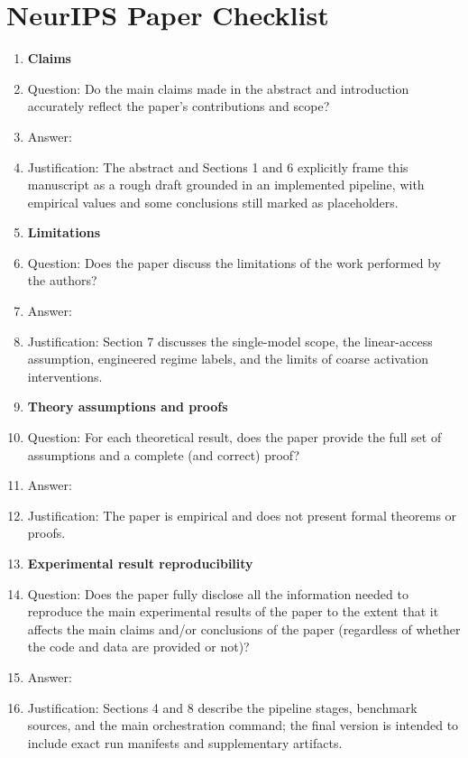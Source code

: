 \section*{NeurIPS Paper Checklist}

\begin{enumerate}

\item {\bf Claims}
    \item[] Question: Do the main claims made in the abstract and introduction accurately reflect the paper's contributions and scope?
    \item[] Answer: \answerYes{}
    \item[] Justification: The abstract and Sections 1 and 6 explicitly frame this manuscript as a rough draft grounded in an implemented pipeline, with empirical values and some conclusions still marked as placeholders.

\item {\bf Limitations}
    \item[] Question: Does the paper discuss the limitations of the work performed by the authors?
    \item[] Answer: \answerYes{}
    \item[] Justification: Section 7 discusses the single-model scope, the linear-access assumption, engineered regime labels, and the limits of coarse activation interventions.

\item {\bf Theory assumptions and proofs}
    \item[] Question: For each theoretical result, does the paper provide the full set of assumptions and a complete (and correct) proof?
    \item[] Answer: \answerNA{}
    \item[] Justification: The paper is empirical and does not present formal theorems or proofs.

\item {\bf Experimental result reproducibility}
    \item[] Question: Does the paper fully disclose all the information needed to reproduce the main experimental results of the paper to the extent that it affects the main claims and/or conclusions of the paper (regardless of whether the code and data are provided or not)?
    \item[] Answer: \answerYes{}
    \item[] Justification: Sections 4 and 8 describe the pipeline stages, benchmark sources, and the main orchestration command; the final version is intended to include exact run manifests and supplementary artifacts.


\end{enumerate}
